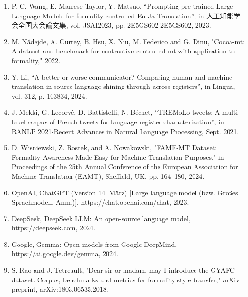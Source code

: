 \documentclass[fleqn,moreauthors,10pt]{ds_report}
\begin{document}
		
		
		\renewcommand{\labelenumi}{[\theenumi]}
		\begin{enumerate}
			\item  P. C. Wang, E. Marrese-Taylor, Y. Matsuo, “Prompting pre-trained Large Language Models for formality-controlled En-Ja Translation”, in 人工知能学会全国大会論文集, vol. JSAI2023, pp. 2E5GS602-2E5GS602, 2023.
			\item M. N\u{a}dejde, A. Currey, B. Hsu, X. Niu, M. Federico and G. Dinu, "Cocoa-mt: A dataset and benchmark for contrastive controlled mt with application to formality," 2022.
			\item Y. Li, “A better or worse communicator? Comparing human and machine translation in source language shining through across registers”, in Lingua, vol. 312, p. 103834, 2024.
			\item J. Mekki, G. Lecorvé, D. Battistelli, N. Béchet, “TREMoLo-tweets: A multi-label corpus of French tweets for language register characterization”, in RANLP 2021-Recent Advances in Natural Language Processing, Sept. 2021.
			\item D. Wisniewski, Z. Rostek, and A. Nowakowski, "FAME-MT Dataset: Formality Awareness Made Easy for Machine Translation Purposes," in Proceedings of the 25th Annual Conference of the European Association for Machine Translation (EAMT), Sheffield, UK, pp. 164–180, 2024.
			\item OpenAI, ChatGPT (Version 14. März) [Large language model (bzw. Großes Sprachmodell, Anm.)]. https://chat.openai.com/chat, 2023.
			\item DeepSeek, DeepSeek LLM: An open-source language model, https://deepseek.com, 2024.
			\item Google, Gemma: Open models from Google DeepMind, https://ai.google.dev/gemma, 2024.
			\item S. Rao and J. Tetreault, "Dear sir or madam, may I introduce the GYAFC dataset: Corpus, benchmarks and metrics for formality style transfer," arXiv preprint, arXiv:1803.06535,2018.
		\end{enumerate}
		
		
	
\end{document}
